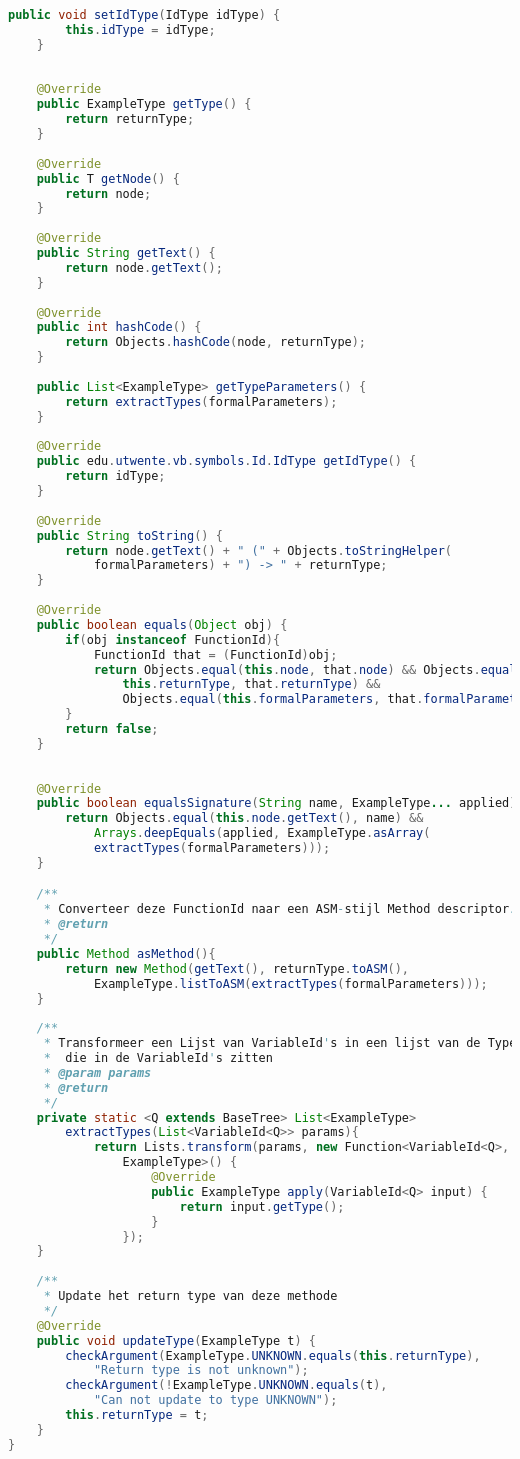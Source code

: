 \begin{lstlisting}[language=Java]
	public void setIdType(IdType idType) {
		this.idType = idType;
	}
	
	
	@Override
	public ExampleType getType() {
		return returnType;
	}
	
	@Override
	public T getNode() {
		return node;
	}
	
	@Override
	public String getText() {
		return node.getText();
	}
	
	@Override
	public int hashCode() {
		return Objects.hashCode(node, returnType);
	}
	
	public List<ExampleType> getTypeParameters() {
		return extractTypes(formalParameters);
	}
	
	@Override
	public edu.utwente.vb.symbols.Id.IdType getIdType() {
		return idType;
	}
	
	@Override
	public String toString() {
		return node.getText() + " (" + Objects.toStringHelper(
            formalParameters) + ") -> " + returnType;
	}
	
	@Override
	public boolean equals(Object obj) {
		if(obj instanceof FunctionId){
			FunctionId that = (FunctionId)obj;
			return Objects.equal(this.node, that.node) && Objects.equal(
                this.returnType, that.returnType) && 
                Objects.equal(this.formalParameters, that.formalParameters);
		}
		return false;
	}
	
	
	@Override
	public boolean equalsSignature(String name, ExampleType... applied) {
		return Objects.equal(this.node.getText(), name) && 
            Arrays.deepEquals(applied, ExampleType.asArray(
            extractTypes(formalParameters)));
	}

	/**
	 * Converteer deze FunctionId naar een ASM-stijl Method descriptor.
	 * @return
	 */
	public Method asMethod(){
		return new Method(getText(), returnType.toASM(), 
            ExampleType.listToASM(extractTypes(formalParameters)));
	}
	
	/**
	 * Transformeer een Lijst van VariableId's in een lijst van de Type's
     *  die in de VariableId's zitten
	 * @param params 
	 * @return
	 */
	private static <Q extends BaseTree> List<ExampleType> 
        extractTypes(List<VariableId<Q>> params){
    		return Lists.transform(params, new Function<VariableId<Q>, 
                ExampleType>() {
        			@Override
        			public ExampleType apply(VariableId<Q> input) {
        				return input.getType();
        			}
        		});
    }
	
	/**
	 * Update het return type van deze methode 
	 */
	@Override
	public void updateType(ExampleType t) {
		checkArgument(ExampleType.UNKNOWN.equals(this.returnType), 
            "Return type is not unknown");
		checkArgument(!ExampleType.UNKNOWN.equals(t), 
            "Can not update to type UNKNOWN");
		this.returnType = t;
	}
}

\end{lstlisting}
